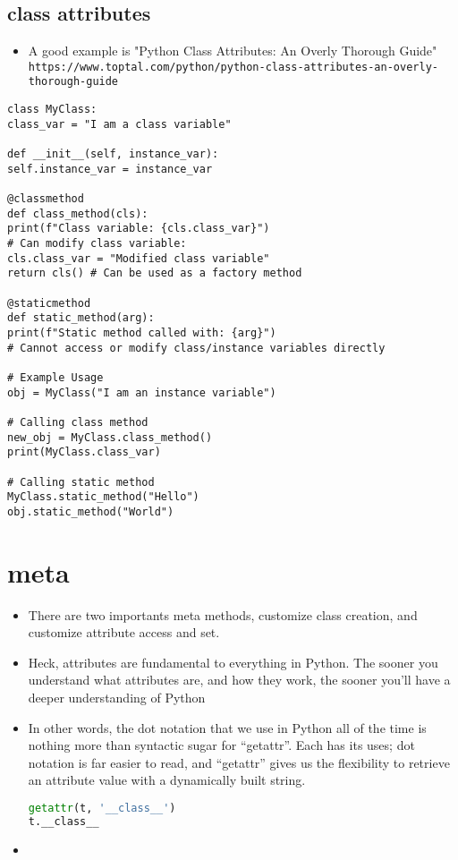 \documentclass[a4paper,12pt,twoside]{book}
\begin{document}
\section{class attributes}
\begin{itemize}
	
	\item A good example is "Python Class Attributes: An Overly Thorough Guide" \verb!https://www.toptal.com/python/python-class-attributes-an-overly-thorough-guide!
\end{itemize}

\begin{lstlisting}
class MyClass:
class_var = "I am a class variable"

def __init__(self, instance_var):
self.instance_var = instance_var

@classmethod
def class_method(cls):
print(f"Class variable: {cls.class_var}")
# Can modify class variable:
cls.class_var = "Modified class variable"
return cls() # Can be used as a factory method

@staticmethod
def static_method(arg):
print(f"Static method called with: {arg}")
# Cannot access or modify class/instance variables directly

# Example Usage
obj = MyClass("I am an instance variable")

# Calling class method
new_obj = MyClass.class_method() 
print(MyClass.class_var)

# Calling static method
MyClass.static_method("Hello")
obj.static_method("World")
\end{lstlisting}



\chapter{meta}
\begin{itemize}
	\item There are two importants meta methods, customize class creation, and customize attribute access and set. 
	\item Heck, attributes are fundamental to everything in Python. The sooner you understand what attributes are, and how they work, the sooner you’ll have a deeper understanding of Python
	\item In other words, the dot notation that we use in Python all of the time is nothing more than syntactic sugar for “getattr”. Each has its uses; dot notation is far easier to read, and “getattr” gives us the flexibility to retrieve an attribute value with a dynamically built string.
\begin{lstlisting}[frame=single, language=python]
getattr(t, '__class__')
t.__class__
\end{lstlisting} 
	\item 
	
\end{itemize}
\end{document}
